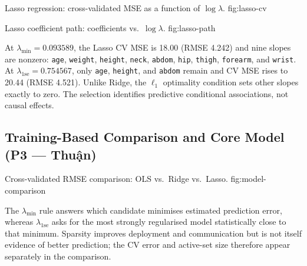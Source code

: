 %
    {Lasso regression: cross-validated MSE as a function of $\log\lambda$.}%
    {fig:lasso-cv}

%
    {Lasso coefficient path: coefficients vs.\ $\log\lambda$.}%
    {fig:lasso-path}





At $\lambda_{\min}=0.093589$, the Lasso CV MSE is 18.00 (RMSE 4.242) and
nine slopes are nonzero: \texttt{age}, \texttt{weight}, \texttt{height},
\texttt{neck}, \texttt{abdom}, \texttt{hip}, \texttt{thigh},
\texttt{forearm}, and \texttt{wrist}.  At
$\lambda_{1\mathrm{se}}=0.754567$, only \texttt{age}, \texttt{height}, and
\texttt{abdom} remain and CV MSE rises to 20.44 (RMSE 4.521).  Unlike Ridge,
the $\ell_1$ optimality condition sets other slopes exactly to zero.  The
selection identifies predictive conditional associations, not causal effects.

\subsection{Training-Based Comparison and Core Model (P3 — Thuận)}
\label{sec:comparison}



%
    {Cross-validated RMSE comparison: OLS vs.\ Ridge vs.\ Lasso.}%
    {fig:model-comparison}

\bigskip
\noindent
{}

The $\lambda_{\min}$ rule answers which candidate minimises estimated
prediction error, whereas $\lambda_{1\mathrm{se}}$ asks for the most strongly
regularised model statistically close to that minimum.  Sparsity improves
deployment and communication but is not itself evidence of better prediction;
the CV error and active-set size therefore appear separately in the comparison.

